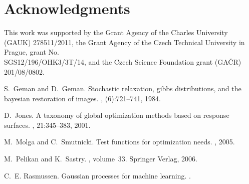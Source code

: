 \documentclass{sig-alternate}
\begin{document}


\section{Acknowledgments}

This work was supported by 
the Grant Agency of the Charles University (GAUK) 278511/2011,
the Grant Agency of the Czech Technical University in Prague, grant No. \\ 
SGS12/196/OHK3/3T/14, 
and the Czech Science Foundation grant (GA\v{C}R) 201/08/0802.

%

\begin{thebibliography}{1}

S.~Geman and D.~Geman.
\newblock Stochastic relaxation, gibbs distributions, and the bayesian
  restoration of images.
, (6):721--741, 1984.

D.~Jones.
\newblock A taxonomy of global optimization methods based on response surfaces.
, 21:345--383, 2001.

M.~Molga and C.~Smutnicki.
\newblock Test functions for optimization needs.
, 2005.

M.~Pelikan and K.~Sastry.
, volume~33.
\newblock Springer Verlag, 2006.

C.~E. Rasmussen.
\newblock Gaussian processes for machine learning.
.

\end{thebibliography}
%
%
\end{document}
